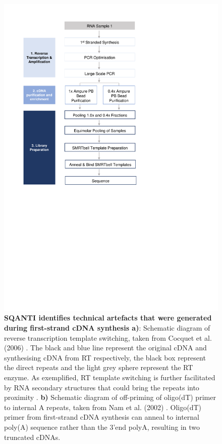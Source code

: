\begin{figure}[h]
	\begin{center}
		\includegraphics[page=4,trim={2cm 21cm 0 1cm},clip, scale = 1]{Figures/ProjectDevelopment_Figures.pdf}
	\end{center}
	\captionsetup{width=0.95\textwidth}
	\caption[Technical artefacts generated during library preparation and identified in SQANTI]%
	{\textbf{SQANTI identifies technical artefacts that were generated during first-strand cDNA synthesis a)}: Schematic diagram of reverse transcription template switching, taken from Cocquet et al.(2006) \cite{Cocquet2006}. The black and blue line represent the original cDNA and synthesising cDNA from RT respectively, the black box represent the direct repeats and the light grey sphere represent the RT enzyme. As exemplified, RT template switching is further facilitated by RNA secondary structures that could bring the repeats into proximity \cite{Cocquet2006}. \textbf{b)} Schematic diagram of off-priming of oligo(dT) primer to internal A repeats, taken from Nam et al. (2002) \cite{Nam2002}. Oligo(dT) primer from first-strand cDNA synthesis can anneal to internal poly(A) sequence rather than the 3'end polyA, resulting in two truncated cDNAs.}
	\label{fig:lib_prep_artifacts}
\end{figure}

